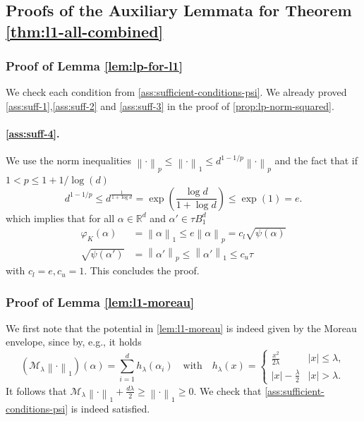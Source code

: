 \documentclass[a4paper]{article}
\newcommand{\pr}[1]{\left(#1\right)}
\newcommand{\abs}[1]{\left\lvert#1\right\rvert}
\newcommand{\norm}[1]{\left\|#1\right\|}
\newcommand{\RR}[0]{\mathbb{R}}
\newcommand{\cM}[0]{\mathcal{M}}
\theoremstyle{thmstyle}
\theoremstyle{defstyle}
\theoremstyle{remark}
\begin{document}
\subsection{Proofs of the Auxiliary Lemmata for Theorem \ref{thm:l1-all-combined}}
\label{subsec:proofs-auxiliary-l1-lemmas}

\subsubsection{Proof of Lemma \ref{lem:lp-for-l1}}

    We check each condition from \cref{ass:sufficient-conditions-psi}. We already proved \ref{ass:suff-1},\ref{ass:suff-2} and \ref{ass:suff-3} in the proof of \cref{prop:lp-norm-squared}.
    
    
    \paragraph{\ref{ass:suff-4}.} We use the norm inequalities $\norm{\cdot}_p \leq \norm{\cdot}_1 \leq d^{1-1/p}\norm{\cdot}_p$ and the fact that if $1<p\leq 1+1/\log(d)$ 
    \begin{equation*}
        d^{1-1/p}\leq d^{\frac{1}{1+\log d}}=\exp\pr{\frac{\log d}{1+\log d}} \leq \exp(1)=e.
    \end{equation*}
    which implies that for all $\alpha\in\RR^d$ and $\alpha'\in \tau B_1^d$
    \begin{align*}
        \varphi_K(\alpha)&=\norm{\alpha}_1\leq e \norm{\alpha}_p = c_l\sqrt{\psi(\alpha)} \\
        \sqrt{\psi(\alpha')} &=\norm{\alpha'}_p \leq \norm{\alpha'}_1 \leq c_u \tau
    \end{align*}
    with $c_l=e,c_u=1$.
This concludes the proof.

\subsubsection{Proof of Lemma \ref{lem:l1-moreau}}

    We first note that the potential in \cref{lem:l1-moreau} is indeed given by the Moreau envelope, since by, e.g., \cite[Example 4.2]{Beck2012smoothing} it holds
    \begin{equation*}
        (\cM_\lambda\norm{\cdot}_1)(\alpha)=\sum_{i=1}^d h_\lambda(\alpha_i) \quad \text{with} \quad h_\lambda (x)= \begin{cases} \frac{x^2}{2\lambda} & \abs{x}\leq \lambda, \\ \abs{x}-\frac{\lambda}{2} & \abs{x}> \lambda .\end{cases}
    \end{equation*}
    It follows that $\cM_\lambda \norm{\cdot}_1+\frac{d\lambda}{2}\geq \norm{\cdot}_1\geq 0$. We check that \cref{ass:sufficient-conditions-psi} is indeed satisfied.
    
\end{document}
